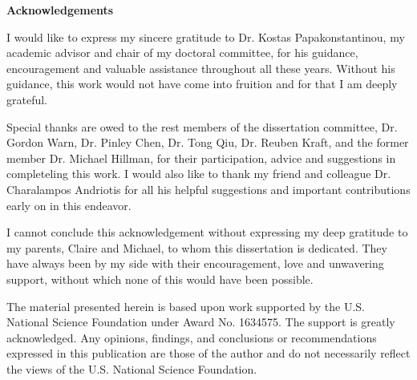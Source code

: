 \clearpage
{}
\begin{center}
\textbf{\Large Acknowledgements}\\
\vspace{\baselineskip}
\end{center}

I would like to express my sincere gratitude to Dr. Kostas Papakonstantinou, my 
academic advisor and chair of my doctoral committee, for his guidance, 
encouragement and valuable assistance throughout all these years. Without 
his guidance, this work would not have come into fruition and for that I am 
deeply grateful.

Special thanks are owed to the rest members of the dissertation committee, Dr. 
Gordon Warn, Dr. Pinley Chen, Dr. Tong Qiu, Dr. Reuben Kraft, and the former 
member Dr. Michael Hillman, for their 
participation, advice and suggestions in completeling this work. I would also 
like to thank my friend and colleague Dr. Charalampos Andriotis for all his 
helpful suggestions and important contributions early on in this endeavor.

I cannot conclude this acknowledgement without expressing my deep gratitude to 
my parents, Claire and Michael, to whom this dissertation is dedicated. They  
have always been by my side with their encouragement, love and unwavering 
support, without which none of this would have been possible.

The material presented herein is based upon work supported by the U.S. National 
Science Foundation under Award No. 1634575. The support is greatly 
acknowledged. Any opinions, findings, and conclusions or recommendations 
expressed in this publication are those of the author and do not necessarily 
reflect the views of the U.S. National Science Foundation.
\clearpage
